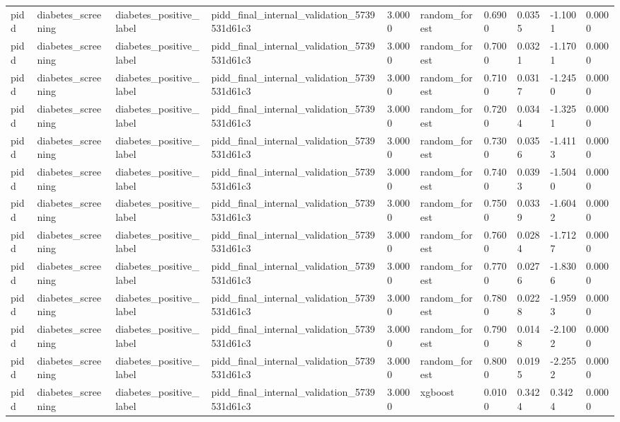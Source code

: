 \begin{tabular}{llllllllll}
pidd & diabetes\_screening & diabetes\_positive\_label & pidd\_final\_internal\_validation\_5739531d61c3 & 3.0000 & random\_forest & 0.6900 & 0.0355 & -1.1001 & 0.0000 \\
pidd & diabetes\_screening & diabetes\_positive\_label & pidd\_final\_internal\_validation\_5739531d61c3 & 3.0000 & random\_forest & 0.7000 & 0.0321 & -1.1701 & 0.0000 \\
pidd & diabetes\_screening & diabetes\_positive\_label & pidd\_final\_internal\_validation\_5739531d61c3 & 3.0000 & random\_forest & 0.7100 & 0.0317 & -1.2450 & 0.0000 \\
pidd & diabetes\_screening & diabetes\_positive\_label & pidd\_final\_internal\_validation\_5739531d61c3 & 3.0000 & random\_forest & 0.7200 & 0.0344 & -1.3251 & 0.0000 \\
pidd & diabetes\_screening & diabetes\_positive\_label & pidd\_final\_internal\_validation\_5739531d61c3 & 3.0000 & random\_forest & 0.7300 & 0.0356 & -1.4113 & 0.0000 \\
pidd & diabetes\_screening & diabetes\_positive\_label & pidd\_final\_internal\_validation\_5739531d61c3 & 3.0000 & random\_forest & 0.7400 & 0.0393 & -1.5040 & 0.0000 \\
pidd & diabetes\_screening & diabetes\_positive\_label & pidd\_final\_internal\_validation\_5739531d61c3 & 3.0000 & random\_forest & 0.7500 & 0.0339 & -1.6042 & 0.0000 \\
pidd & diabetes\_screening & diabetes\_positive\_label & pidd\_final\_internal\_validation\_5739531d61c3 & 3.0000 & random\_forest & 0.7600 & 0.0284 & -1.7127 & 0.0000 \\
pidd & diabetes\_screening & diabetes\_positive\_label & pidd\_final\_internal\_validation\_5739531d61c3 & 3.0000 & random\_forest & 0.7700 & 0.0276 & -1.8306 & 0.0000 \\
pidd & diabetes\_screening & diabetes\_positive\_label & pidd\_final\_internal\_validation\_5739531d61c3 & 3.0000 & random\_forest & 0.7800 & 0.0228 & -1.9593 & 0.0000 \\
pidd & diabetes\_screening & diabetes\_positive\_label & pidd\_final\_internal\_validation\_5739531d61c3 & 3.0000 & random\_forest & 0.7900 & 0.0148 & -2.1002 & 0.0000 \\
pidd & diabetes\_screening & diabetes\_positive\_label & pidd\_final\_internal\_validation\_5739531d61c3 & 3.0000 & random\_forest & 0.8000 & 0.0195 & -2.2552 & 0.0000 \\
pidd & diabetes\_screening & diabetes\_positive\_label & pidd\_final\_internal\_validation\_5739531d61c3 & 3.0000 & xgboost & 0.0100 & 0.3424 & 0.3424 & 0.0000 \\

\end{tabular}
